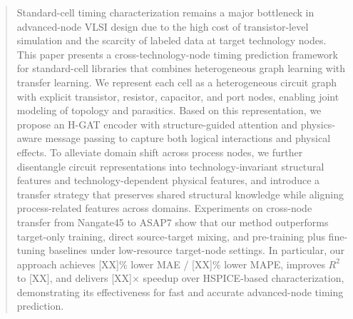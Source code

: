 \begin{abstract}
Standard-cell timing characterization remains a major bottleneck in advanced-node VLSI design due to the high cost of transistor-level simulation and the scarcity of labeled data at target technology nodes. This paper presents a cross-technology-node timing prediction framework for standard-cell libraries that combines heterogeneous graph learning with transfer learning. We represent each cell as a heterogeneous circuit graph with explicit transistor, resistor, capacitor, and port nodes, enabling joint modeling of topology and parasitics. Based on this representation, we propose an H-GAT encoder with structure-guided attention and physics-aware message passing to capture both logical interactions and physical effects. To alleviate domain shift across process nodes, we further disentangle circuit representations into technology-invariant structural features and technology-dependent physical features, and introduce a transfer strategy that preserves shared structural knowledge while aligning process-related features across domains. Experiments on cross-node transfer from Nangate45 to ASAP7 show that our method outperforms target-only training, direct source-target mixing, and pre-training plus fine-tuning baselines under low-resource target-node settings. In particular, our approach achieves [XX]\% lower MAE / [XX]\% lower MAPE, improves $R^2$ to [XX], and delivers [XX]$\times$ speedup over HSPICE-based characterization, demonstrating its effectiveness for fast and accurate advanced-node timing prediction.
\end{abstract}

